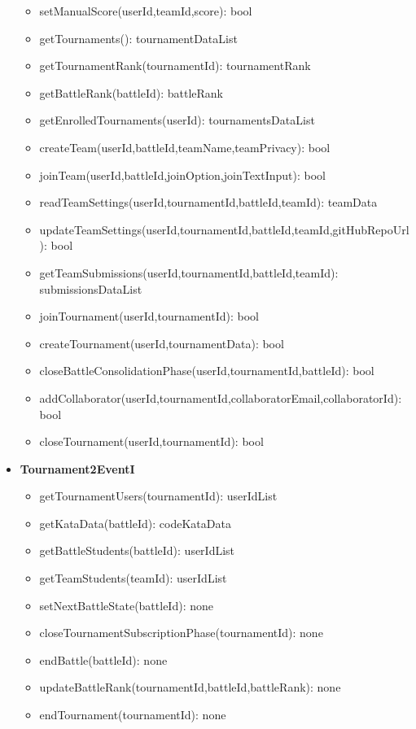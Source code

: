 \begin{itemize}
\begin{itemize}
        \item setManualScore(userId,teamId,score): bool
        \item getTournaments(): tournamentDataList
        \item getTournamentRank(tournamentId): tournamentRank
        \item getBattleRank(battleId): battleRank
        \item getEnrolledTournaments(userId): tournamentsDataList
        \item createTeam(userId,battleId,teamName,teamPrivacy): bool
        \item joinTeam(userId,battleId,joinOption,joinTextInput): bool
        \item readTeamSettings(userId,tournamentId,battleId,teamId): teamData
        \item updateTeamSettings(userId,tournamentId,battleId,teamId,gitHubRepoUrl): bool
        \item getTeamSubmissions(userId,tournamentId,battleId,teamId): submissionsDataList
        \item joinTournament(userId,tournamentId): bool
        \item createTournament(userId,tournamentData): bool
        \item closeBattleConsolidationPhase(userId,tournamentId,battleId): bool
        \item addCollaborator(userId,tournamentId,collaboratorEmail,collaboratorId): bool
        \item closeTournament(userId,tournamentId): bool
    \end{itemize}
    \item \textbf{Tournament2EventI}
    \begin{itemize}
        \item getTournamentUsers(tournamentId): userIdList
        \item getKataData(battleId): codeKataData
        \item getBattleStudents(battleId): userIdList
        \item getTeamStudents(teamId): userIdList
        \item setNextBattleState(battleId): none
        \item closeTournamentSubscriptionPhase(tournamentId): none
        \item endBattle(battleId): none
        \item updateBattleRank(tournamentId,battleId,battleRank): none
        \item endTournament(tournamentId): none

\end{itemize}
\end{itemize}
